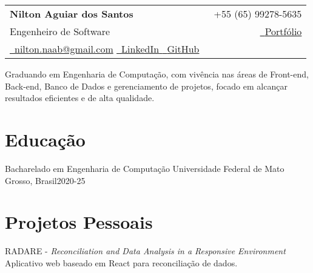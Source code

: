 

\newcommand{\name}{Nilton Aguiar dos Santos} %
\newcommand{\course}{Engenharia de Computação} %
\newcommand{\phone}{+55 (65) 99278-5635} %
\newcommand{\emaila}{nilton.naab@gmail.com} %
\newcommand{\github}{https://github.com/notNilton} %
\newcommand{\linkedin}{https://www.linkedin.com/in/notnilton/} %
\newcommand{\portifolio}{https://github.com/notNilton} %



\selectfont

{
\begin{tabularx}{\linewidth}{L r} \\
    \textbf{\Large \name} & {\raisebox{0.0\height}{\footnotesize \faPhone}\ \phone}
    \\
    {Engenheiro de Software}
    &
    \href{\portifolio}{\raisebox{0.0\height}{\footnotesize \faGlobe}\ {Portfólio}}
    \\
    \href{mailto:\emaila} {\raisebox{0.0\height}{\footnotesize \faEnvelope}\ {\emaila}}
    \href{\linkedin}{\raisebox{0.0\height}{\footnotesize \faLinkedin}\ {LinkedIn} }
    \href{\github}{\raisebox{0.0\height}{\footnotesize \faGithub}\ {GitHub} }
\end{tabularx}
} 
\vspace{1mm}

Graduando em Engenharia de Computação, com vivência nas áreas de Front-end, Back-end, Banco de Dados e gerenciamento de projetos, focado em alcançar resultados eficientes e de alta qualidade.

\section{\textbf{Educação}}
    \resumeSubHeadingListStart
    \resumeSubheading
    {Bacharelado em Engenharia de Computação}{}
    {Universidade Federal de Mato Grosso, Brasil}{2020-25}
    \resumeSubHeadingListEnd
\vspace{-5.5mm}

\section{\textbf{Projetos Pessoais}}
\resumeSubHeadingListStart
    \resumeProject
      { RADARE - \textit{Reconciliation and Data Analysis in a Responsive Environment}}
      {Aplicativo web baseado em React para reconciliação de dados.}
      {}

